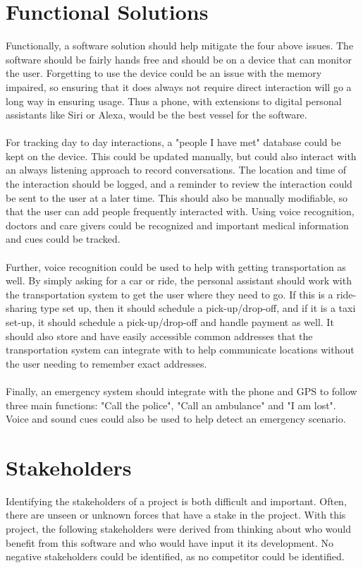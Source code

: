 \documentclass[12pt]{article}
\theoremstyle{plain}
\theoremstyle{definition}
\begin{document}
\section*{Functional Solutions}
Functionally, a software solution should help mitigate the four above issues.  The software should be fairly hands free and should be on a device that can monitor the user.  Forgetting to use the device could be an issue with the memory impaired, so ensuring that it does always not require direct interaction will go a long way in ensuring usage.  Thus a phone, with extensions to digital personal assistants like Siri or Alexa, would be the best vessel for the software.\\
\\
For tracking day to day interactions, a "people I have met" database could be kept on the device.  This could be updated manually, but could also interact with an always listening approach to record conversations.  The location and time of the interaction should be logged, and a reminder to review the interaction could be sent to the user at a later time.  This should also be manually modifiable, so that the user can add people frequently interacted with.  Using voice recognition, doctors and care givers could be recognized and important medical information and cues could be tracked.\\
\\
Further, voice recognition could be used to help with getting transportation as well.  By simply asking for a car or ride, the personal assistant should work with the transportation system to get the user where they need to go.  If this is a ride-sharing type set up, then it should schedule a pick-up/drop-off, and if it is a taxi set-up, it should schedule a pick-up/drop-off and handle payment as well. It should also store and have easily accessible common addresses that the transportation system can integrate with to help communicate locations without the user needing to remember exact addresses.\\
\\
Finally, an emergency system should integrate with the phone and GPS to follow three main functions: "Call the police", "Call an ambulance" and "I am lost".  Voice and sound cues could also be used to help detect an emergency scenario.\\



\section*{Stakeholders}
Identifying the stakeholders of a project is both difficult and important.  Often, there are unseen or unknown forces that have a stake in the project.  With this project, the following stakeholders were derived from thinking about who would benefit from this software and who would have input it its development.  No negative stakeholders could be identified, as no competitor could be identified.
\end{document}
